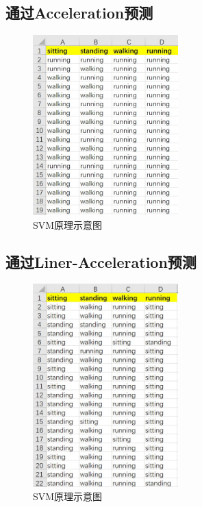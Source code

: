 \documentclass[UTF8]{ctexart}
\begin{document}
\subsection{通过Acceleration预测}
\begin{figure}[H]
    \centering
    \includegraphics[width=0.5\textwidth]{pic/pre_a.jpg}
    \caption{SVM原理示意图}
    \label{fig:demo}
\end{figure}

\subsection{通过Liner-Acceleration预测}
\begin{figure}[H]
    \centering
    \includegraphics[width=0.5\textwidth]{pic/pre_LA.jpg}
    \caption{SVM原理示意图}
    \label{fig:demo}
\end{figure}
\end{document}
